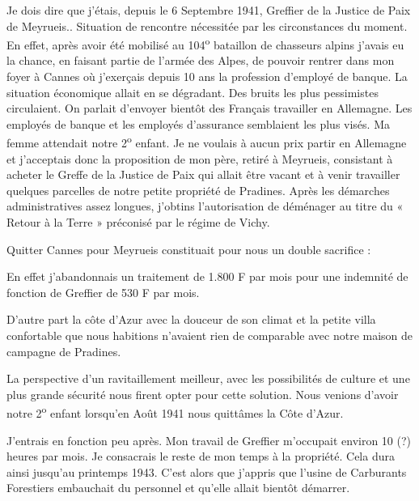 Je dois dire que j’étais, depuis le 6 Septembre 1941, Greffier de la Justice de Paix de
Meyrueis.. Situation de rencontre nécessitée par les circonstances du moment. En effet, après
avoir été mobilisé au 104\textsuperscript{o} bataillon de chasseurs alpins j’avais eu la chance, en faisant partie
de l’armée des Alpes, de pouvoir rentrer dans mon foyer à Cannes où j’exerçais depuis 10 ans
la profession d’employé de banque. La situation économique allait en se dégradant. Des bruits
les plus pessimistes circulaient. On parlait d’envoyer bientôt des Français travailler en
Allemagne. Les employés de banque et les employés d’assurance semblaient les plus visés.
Ma femme attendait notre 2\textsuperscript{o} enfant. Je ne voulais à aucun prix partir en Allemagne et
j’acceptais donc la proposition de mon père, retiré à Meyrueis, consistant à acheter le Greffe
de la Justice de Paix qui allait être vacant et à venir travailler quelques parcelles de notre
petite propriété de Pradines. Après les démarches administratives assez longues, j’obtins
l’autorisation de déménager au titre du « Retour à la Terre » préconisé par le régime de
Vichy.

\vspace{0.45cm}

Quitter Cannes pour Meyrueis constituait pour nous un double sacrifice :

En effet j’abandonnais un traitement de 1.800 F par mois pour une indemnité de fonction de
Greffier de 530 F par mois.

D’autre part la côte d’Azur avec la douceur de son climat et la petite villa confortable que
nous habitions n’avaient rien de comparable avec notre maison de campagne de Pradines.

\clearpage


La perspective d’un ravitaillement meilleur, avec les possibilités de culture et une plus grande
sécurité nous firent opter pour cette solution. Nous venions d’avoir notre 2\textsuperscript{o}
enfant lorsqu’en Août 1941 nous quittâmes la Côte d’Azur.

\vspace{0.45cm}

J’entrais en fonction peu après. Mon travail de Greffier m’occupait environ 10 (?) heures par
mois. Je consacrais le reste de mon temps à la propriété. Cela dura ainsi jusqu’au printemps
1943. C’est alors que j’appris que l’usine de Carburants Forestiers embauchait du personnel
et qu’elle allait bientôt démarrer.

